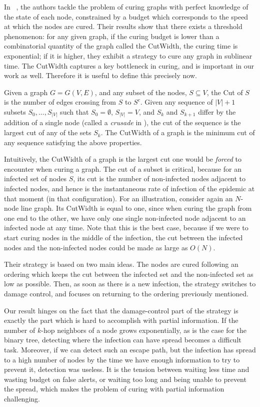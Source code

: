 In ~\cite{Drakopoulos2015,Drakopoulos2014}, the authors tackle the problem of curing graphs with perfect knowledge of the state of each node, constrained by a budget which corresponds to the speed at which the nodes are cured. Their results show that there exists a threshold phenomenon: for any given graph, if the curing budget is lower than a combinatorial quantity of the graph called the {\sc CutWidth}, the curing time is exponential; if it is higher, they exhibit a strategy to cure any graph in sublinear time. The {\sc CutWidth} captures a key bottleneck in curing, and is important in our work as well. Therefore it is useful to define this precisely now.
\begin{definition}
\label{def:cutwidth}
Given a graph $G = G(V,E)$, and any subset of the nodes, $S \subseteq V$, the {\sc Cut} of $S$ is the number of edges crossing from $S$ to $S^c$. Given any sequence of $|V|+1$ subsets $S_0,\dots,S_{|V|}$ such that $S_0 = \emptyset$, $S_{|V|} = V$, and $S_k$ and $S_{k+1}$ differ by the addition of a single node (called a {\em crusade} in \cite{Drakopoulos2014,Drakopoulos2015}), the cut of the sequence is the largest cut of any of the sets $S_k$. The {\sc CutWidth} of a graph is the minimum cut of any sequence satisfying the above properties.
\end{definition}
Intuitively, the {\sc CutWidth} of a graph is the largest cut one would be {\em forced} to encounter when curing a graph. The cut of a subset is critical, because for an infected set of nodes $S$, its cut is the number of non-infected nodes adjacent to infected nodes, and hence is the instantaneous rate of infection of the epidemic at that moment (in that configuration). For an illustration, consider again an $N$-node line graph. Its {\sc CutWidth} is equal to one, since when curing the graph from one end to the other, we have only one single non-infected node adjacent to an infected node at any time. Note that this is the best case, because if we were to start curing nodes in the middle of the infection, the cut between the infected nodes and the non-infected nodes could be made as large as $O(N)$. 

Their strategy is based on two main ideas. The nodes are cured following an ordering which keeps the cut between the infected set and the non-infected set as low as possible. Then, as soon as there is a new infection, the strategy switches to damage control, and focuses on returning to the ordering previously mentioned. 

Our result hinges on the fact that the damage-control part of the strategy is exactly the part which is hard to accomplish with partial information. If the number of $k$-hop neighbors of a node grows exponentially, as is the case for the binary tree, detecting where the infection can have spread becomes a difficult task. Moreover, if we can detect such an escape path, but the infection has spread to a high number of nodes by the time we have enough information to try to prevent it, detection was useless. It is the tension between waiting less time and wasting budget on false alerts, or waiting too long and being unable to prevent the spread, which makes the problem of curing with partial information challenging. 
 
 